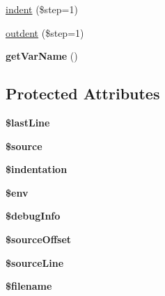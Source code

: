 \begin{DoxyCompactItemize}
\item 
\hyperlink{class_twig___compiler_ae38e0e6d69bdddcc75a75896d5370167}{indent} (\$step=1)
\item 
\hyperlink{class_twig___compiler_ae5c53e68fb6c62e64ac3141b05195efa}{outdent} (\$step=1)
\item 
\hypertarget{class_twig___compiler_a01f345a64ec10225d4205181cf82c811}{}{\bfseries get\+Var\+Name} ()\label{class_twig___compiler_a01f345a64ec10225d4205181cf82c811}

\end{DoxyCompactItemize}
\subsection*{Protected Attributes}
\begin{DoxyCompactItemize}
\item 
\hypertarget{class_twig___compiler_ac7c4a58426a915ffdd1d0fc5c7607414}{}{\bfseries \$last\+Line}\label{class_twig___compiler_ac7c4a58426a915ffdd1d0fc5c7607414}

\item 
\hypertarget{class_twig___compiler_a99a2b085f0a29bd5d799fdcbb63d261b}{}{\bfseries \$source}\label{class_twig___compiler_a99a2b085f0a29bd5d799fdcbb63d261b}

\item 
\hypertarget{class_twig___compiler_aff1f1ea116fe6e27da24f330c01d8718}{}{\bfseries \$indentation}\label{class_twig___compiler_aff1f1ea116fe6e27da24f330c01d8718}

\item 
\hypertarget{class_twig___compiler_aa99ce9ae015e958eef5782267276fbb4}{}{\bfseries \$env}\label{class_twig___compiler_aa99ce9ae015e958eef5782267276fbb4}

\item 
\hypertarget{class_twig___compiler_a601615f391a623af43e3efcffdac222a}{}{\bfseries \$debug\+Info}\label{class_twig___compiler_a601615f391a623af43e3efcffdac222a}

\item 
\hypertarget{class_twig___compiler_a9b0e3f57528b80bcd901acf12393417a}{}{\bfseries \$source\+Offset}\label{class_twig___compiler_a9b0e3f57528b80bcd901acf12393417a}

\item 
\hypertarget{class_twig___compiler_ae84c34a122875c7dd130a831dd5ba5fb}{}{\bfseries \$source\+Line}\label{class_twig___compiler_ae84c34a122875c7dd130a831dd5ba5fb}

\item 
\hypertarget{class_twig___compiler_a0722441477f957078ee2437054556cbc}{}{\bfseries \$filename}\label{class_twig___compiler_a0722441477f957078ee2437054556cbc}

\end{DoxyCompactItemize}


